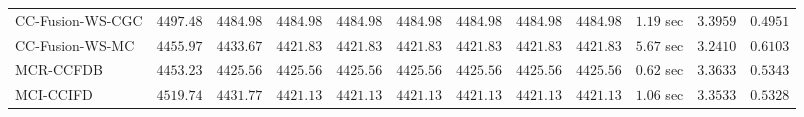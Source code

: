 \begin{table}[H]
\begin{tabular}{lrrrrrrrrrrr}
    CC-Fusion-WS-CGC & $      4497.48$ & $      4484.98$ & $      4484.98$ & $      4484.98$ & $      4484.98$ & $      4484.98$ & $      4484.98$ & $      4484.98$ & $         1.19$ sec    & $       3.3959$  & $       0.4951$ \\ 
     CC-Fusion-WS-MC & $      4455.97$ & $      4433.67$ & $      4421.83$ & $      4421.83$ & $      4421.83$ & $      4421.83$ & $      4421.83$ & $      4421.83$ & $         5.67$ sec    & $       3.2410$  & $       0.6103$ \\ 
\cmidrule{1-1} 
           MCR-CCFDB & $      4453.23$ & $      4425.56$ & $      4425.56$ & $      4425.56$ & $      4425.56$ & $      4425.56$ & $      4425.56$ & $      4425.56$ & $         0.62$ sec    & $       3.3633$  & $       0.5343$ \\ 
\cmidrule{1-1} 
           MCI-CCIFD & $      4519.74$ & $      4431.77$ & $      4421.13$ & $      4421.13$ & $      4421.13$ & $      4421.13$ & $      4421.13$ & $      4421.13$ & $         1.06$ sec    & $       3.3533$  & $       0.5328$ \\ 
\bottomrule
\end{tabular}
\end{table}

